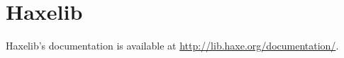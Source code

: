 \chapter{Haxelib}
\label{haxelib}

Haxelib's documentation is available at \href{http://lib.haxe.org/documentation/}{http://lib.haxe.org/documentation/}.